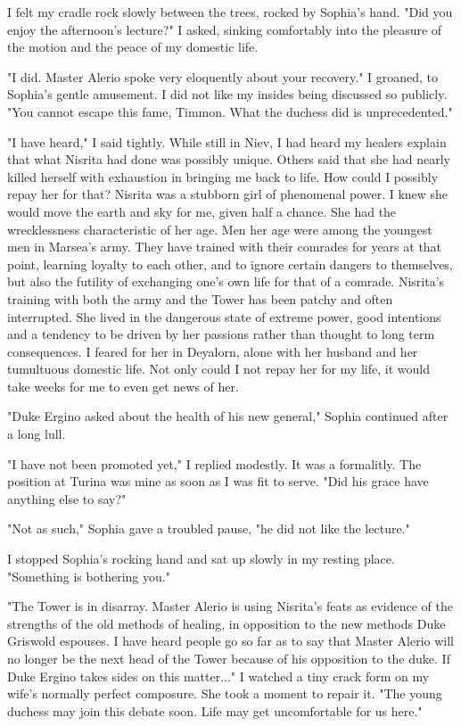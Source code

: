 \documentclass{article}
\begin{document}
I felt my cradle rock slowly between the trees, rocked by Sophia's hand. "Did you enjoy the afternoon's lecture?" I asked, sinking comfortably into the pleasure of the motion and the peace of my domestic life.

"I did. Master Alerio spoke very eloquently about your recovery." I groaned, to Sophia's gentle amusement. I did not like my insides being discussed so publicly. "You cannot escape this fame, Timmon. What the duchess did is unprecedented."

"I have heard," I said tightly. While still in Niev, I had heard my healers explain that what Nisrita had done was possibly unique. Others said that she had nearly killed herself with exhaustion in bringing me back to life. How could I possibly repay her for that? Nisrita was a stubborn girl of phenomenal power. I knew she would move the earth and sky for me, given half a chance. She had the wrecklessness characteristic of her age. Men her age were among the youngest men in Marsea's army. They have trained with their comrades for years at that point, learning loyalty to each other, and to ignore certain dangers to themselves, but also the futility of exchanging one's own life for that of a comrade. Nisrita's training with both the army and the Tower has been patchy and often interrupted. She lived in the dangerous state of extreme power, good intentions and a tendency to be driven by her passions rather than thought to long term consequences. I feared for her in Deyalorn, alone with her husband and her tumultuous domestic life. Not only could I not repay her for my life, it would take weeks for me to even get news of her.

"Duke Ergino asked about the health of his new general," Sophia continued after a long lull.

"I have not been promoted yet," I replied modestly. It was a formalitly. The position at Turina was mine as soon as I was fit to serve. "Did his grace have anything else to say?"

"Not as such," Sophia gave a troubled pause, "he did not like the lecture."

I stopped Sophia's rocking hand and sat up slowly in my resting place. "Something is bothering you."

"The Tower is in disarray. Master Alerio is using Nisrita's feats as evidence of the strengths of the old methods of healing, in opposition to the new methods Duke Griswold espouses. I have heard people go so far as to say that Master Alerio will no longer be the next head of the Tower because of his opposition to the duke. If Duke Ergino takes sides on this matter..." I watched a tiny crack form on my wife's normally perfect composure. She took a moment to repair it. "The young duchess may join this debate soon. Life may get uncomfortable for us here."
\end{document}
